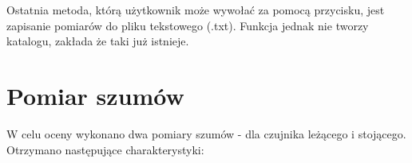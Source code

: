Ostatnia metoda, którą użytkownik może wywołać za pomocą przycisku, jest zapisanie pomiarów do pliku tekstowego (.txt). Funkcja jednak nie tworzy katalogu, zakłada że taki już istnieje.



\section{Pomiar szumów}

W celu oceny wykonano dwa pomiary szumów - dla czujnika leżącego i stojącego. Otrzymano następujące charakterystyki:

\begin{figure}[H]
    \hfill
    \hfill
\end{figure}
